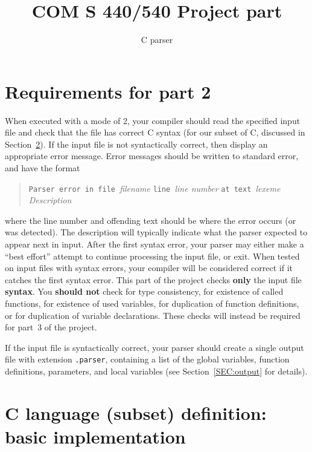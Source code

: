 \documentclass{article}
\title{COM S 440/540 Project part \thispart}
\author{C parser}
\date{}
\newcommand{\thispart}{2}
\newcommand{\typecheck}{3}
\begin{document}
\maketitle


\section{Requirements for part \thispart}

When executed with a mode of \thispart,
your compiler should read the specified input file
and check that the file has correct C syntax
(for our subset of C, discussed in Section~\ref{SEC:language}).
If the input file is not syntactically correct,
then display an appropriate error message.
Error messages should be written to standard error,
and have the format
\begin{quote}
  \begin{tabbing}
		{\tt Parser }\={\tt error in file }\emph{filename}
		{\tt line }\emph{line number}
		{\tt at text }\emph{lexeme}
	\\
		\> \emph{Description}
  \end{tabbing}
\end{quote}
where the line number and offending text should
be where the error occurs (or was detected).
The description will typically indicate
what the parser expected to appear next in input.
After the first syntax error,
your parser may either make a ``best effort''
attempt to continue processing the input file, or exit.
When tested on input files with syntax errors,
your compiler will be considered correct if it catches the first syntax error.
This part of the project checks {\bf only} the input file {\bf syntax}.
You {\bf should not} check for type consistency,
for existence of called functions,
for existence of used variables,
for duplication of function definitions,
  or for duplication of variable declarations.
These checks will instead be required for part~\typecheck{} of the project.


If the input file is syntactically correct,
your parser should create a single output file with extension {\tt .parser},
containing a list of the global variables, function definitions,
parameters, and local variables
(see Section~\ref{SEC:output} for details).


\section{C language (subset) definition: basic implementation}
\label{SEC:language}
\end{document}
